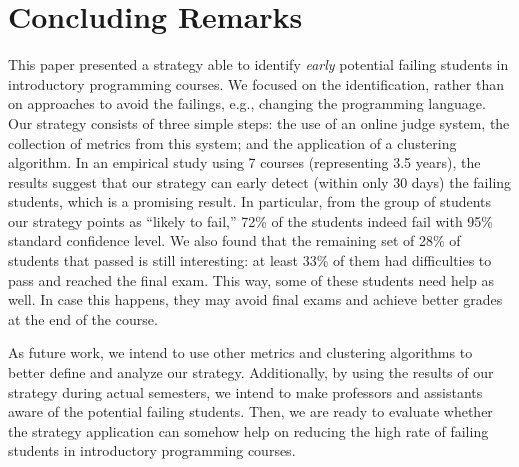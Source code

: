 \section{Concluding Remarks}

This paper presented a strategy able to identify \textit{early} potential failing students in introductory programming courses. We focused on the identification, rather than on approaches to avoid the failings, e.g., changing the programming language. Our strategy consists of three simple steps: the use of an online judge system, the collection of metrics from this system; and the application of a clustering algorithm. In an empirical study using 7 courses (representing 3.5 years), the results suggest that our strategy can early detect (within only 30 days) the failing students, which is a promising result. In particular, from the group of students our strategy points as ``likely to fail,'' 72\% of the students indeed fail with 95\% standard confidence level. We also found that the remaining set of 28\% of students that passed is still interesting: at least 33\% of them had difficulties to pass and reached the final exam. This way, some of these students need help as well. In case this happens, they may avoid final exams and achieve better grades at the end of the course.

As future work, we intend to use other metrics and clustering algorithms to better define and analyze our strategy. Additionally, by using the results of our strategy during actual semesters, we intend to make professors and assistants aware of the potential failing students. Then, we are ready to evaluate whether the strategy application can somehow help on reducing the high rate of failing students in introductory programming courses.